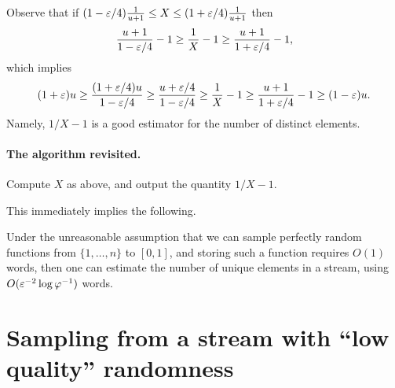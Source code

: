 Observe that if
$ (1-{\varepsilon}/4)\frac{1}{u+1} \leq X \leq (1+{\varepsilon}/4)\frac{1}{u+1}$ then
\begin{equation*}
    \frac{u+1}{1-{\varepsilon}/4} -1  \geq \frac{1}{X} -1  \geq
    \frac{u+1}{1+{\varepsilon}/4}     - 1,
\end{equation*}
which implies
\begin{equation*}
    (1+\eps) u%
    \geq%
    \frac{(1+\eps/4)u}{1-\eps/4}
    \geq
    \frac{u+\eps/4}{1-\eps/4}
    \geq%
    \frac{1}{X} -1
    \geq
    \frac{u+1}{1+\eps/4}     - 1
    \geq
    (1-\eps)u.
\end{equation*}
Namely, $1/X -1$ is a good estimator for the number of distinct
elements.


\paragraph*{The algorithm revisited.}
Compute $X$ as above, and output the quantity $1/X-1$.

\bigskip

This immediately implies the following.

\begin{lemma}
    Under the unreasonable assumption that we can sample perfectly
    random functions from $\{1,\ldots, n\}$ to $[0,1]$, and storing
    such a function requires $O(1)$ words, then one can estimate the
    number of unique elements in a stream, using
    $O( {\varepsilon}^{-2} \log \varphi^{-1})$ words.
\end{lemma}





\newcommand{\distinctX}[1]{\mathrm{set}\pth{#1}}

\section{Sampling from a stream with ``low quality'' randomness}

